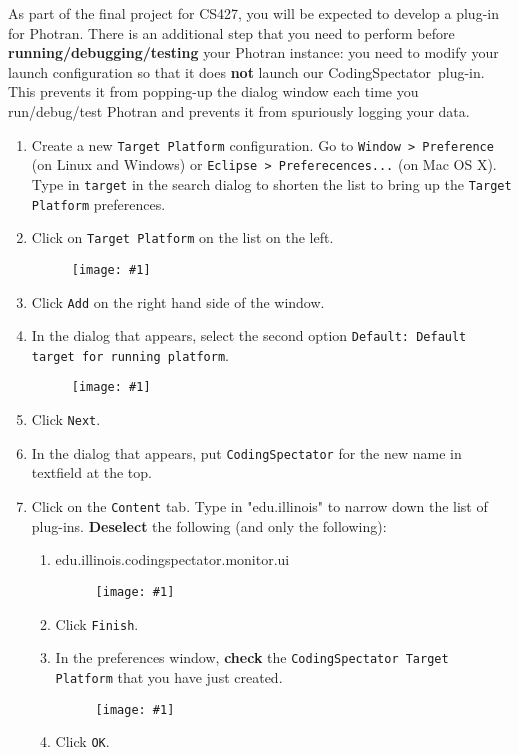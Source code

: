 \documentclass{article}
\newcommand\fig[1]{\texttt{[image: \#1]}}
\newcommand\codspec{CodingSpectator}
\newcommand\uiref[1]{\texttt{#1}}
\begin{document}
As part of the final project for CS427, you will be expected to develop a
plug-in for Photran. There is an additional step that you need to perform before
\textbf{running/debugging/testing} your Photran instance: you need to modify
your launch configuration so that it does \textbf{not} launch our \codspec\
plug-in.  This prevents it from popping-up the dialog window each time you
run/debug/test Photran and prevents it from spuriously logging your data.

\begin{enumerate}
%
\item Create a new \uiref{Target Platform} configuration. Go to \uiref{Window >
Preference} (on Linux and Windows) or \uiref{Eclipse > Preferecences...} (on Mac
OS X). Type in \uiref{target} in the search dialog to shorten the list to bring
up the \uiref{Target Platform} preferences.  \item Click on \uiref{Target
Platform} on the list on the left.

\begin{figure}
%
\centering
%
\fig{figs/target_step1}
%
\end{figure}
%
\item Click \uiref{Add} on the right hand side of the window.
%
\item In the dialog that appears, select the second option \uiref{Default:
Default target for running platform}.

\begin{figure}
%
\centering
%
\fig{figs/target_step2}
%
\end{figure}

\item Click \uiref{Next}.
%
\item In the dialog that appears, put \uiref{\codspec} for the new name in
textfield at the top.
%
\item Click on the \uiref{Content} tab. Type in "edu.illinois" to narrow down
the list of plug-ins. \textbf{Deselect} the following (and only the following):

\begin{enumerate} \item edu.illinois.codingspectator.monitor.ui

\begin{figure}
%
\centering
%
\fig{figs/target_step3}
%
\end{figure}
%
\item Click \uiref{Finish}.
%
\item In the preferences window, \textbf{check} the \uiref{\codspec\ Target
Platform} that you have just created.

\begin{figure}
%
\centering
%
\fig{figs/target_step4}
%
\end{figure}
%
\item Click \uiref{OK}.
%
\end{enumerate}
%
\end{enumerate}
%
\end{document}
